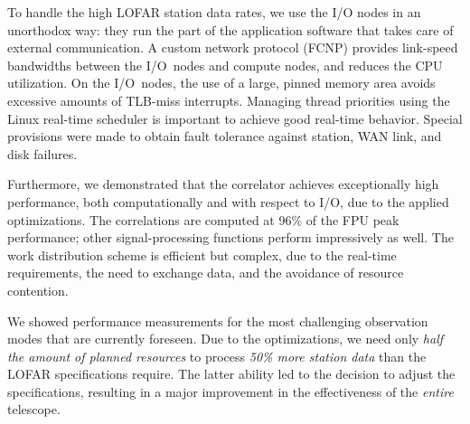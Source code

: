\documentclass{sig-alternate}
\begin{document}
To handle the high LOFAR station data rates, we use the I/O nodes in an
unorthodox way: they run the part of the application software that takes care
of external communication.
A custom network protocol (FCNP) provides link-speed bandwidths between the
I/O~nodes and compute nodes, and reduces the CPU utilization.
On the I/O~nodes, the use of a large, pinned memory area avoids excessive
amounts of TLB-miss interrupts.
Managing thread priorities using the Linux real-time scheduler is important to 
achieve good real-time behavior.
Special provisions were made to obtain fault tolerance against
station, WAN link, and disk failures.

Furthermore, we demonstrated that the correlator achieves exceptionally high
performance, both computationally and with respect to I/O, due to the applied
optimizations.
The correlations are computed at 96\% of the FPU peak performance; other
signal-processing functions perform impressively as well.
The work distribution scheme is efficient but complex, due to the real-time
requirements, the need to exchange data, and the avoidance of resource
contention.


We showed performance measurements for the most challenging observation modes
that are currently foreseen.
Due to the optimizations, we need only \emph{half the amount of planned
resources\/} to process \emph{50\% more station data\/} than the LOFAR
specifications require.
The latter ability led to the decision to adjust the specifications, resulting
in a major improvement in the effectiveness of the \emph{entire\/} telescope.


\end{document}
